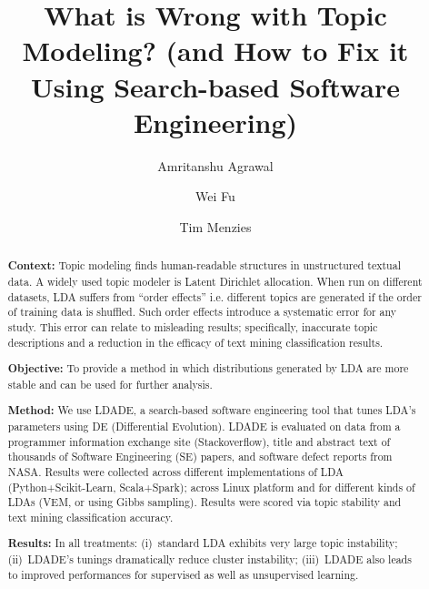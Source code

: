\documentclass[twocolumn,5p,sort&compress]{elsarticle}
\theoremstyle{break}
\begin{document}
\begin{frontmatter}

\title{What is  Wrong with
Topic Modeling? (and How to Fix it Using Search-based Software Engineering)}



\author{Amritanshu Agrawal}



\author{Wei Fu}

\author{Tim Menzies}
\address{Department of Computer Science, North Carolina State University, Raleigh, NC, USA}

\begin{abstract}

\noindent \textbf{Context:} Topic modeling finds
  human-readable structures in unstructured textual data. A
  widely used topic modeler is Latent Dirichlet allocation. When
  run on different datasets, LDA suffers from ``order effects''
  i.e.
 different topics are generated if the order of training data is shuffled.
  Such order effects introduce a
 systematic error for any study. This error can relate to misleading results;
  specifically, inaccurate topic descriptions and a reduction in the efficacy of
  text mining classification results.

 \noindent
\textbf{Objective:} To provide a method in which distributions
generated by LDA are more stable and can be used for further analysis.

 \noindent
\textbf{Method:} We use LDADE, a search-based software engineering tool that tunes LDA's parameters using DE 
(Differential Evolution).
LDADE is evaluated on data from a programmer
information exchange site (Stackoverflow), title and abstract text of thousands
of Software Engineering (SE) papers, and software defect reports from NASA. Results were collected
across different implementations of LDA (Python+Scikit-Learn, Scala+Spark); across
Linux platform and for different kinds of LDAs (VEM, or using Gibbs sampling). 
Results were scored via topic stability and text mining classification accuracy.

\noindent
\textbf{Results:}
In all treatments:
   (i)~standard LDA exhibits very large topic instability;
  (ii)~LDADE's tunings dramatically reduce cluster instability; 
  (iii)~LDADE also leads to  improved performances for supervised as well as unsupervised learning.


\end{abstract}
\end{frontmatter}
\end{document}
